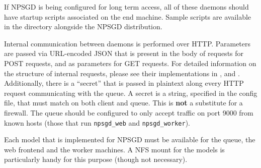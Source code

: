\documentclass{article}
\begin{document}
If NPSGD is being configured for long term access, all of these daemons should
have startup scripts associated on the end machine. Sample scripts are available
in the  directory alongside the NPSGD distribution.

Internal communication between daemons is performed over HTTP. Parameters are passed via URL-encoded
JSON that is present in the body of requests for POST requests, and as
parameters for GET requests. For detailed information on the structure of
internal requests, please see their implementations in ,
 and . Additionally, 
there is a ``secret'' that is passed in plaintext along every HTTP request communicating with the queue.
A secret is a string, specified in the config file, that must match on both client and queue. This
is \textbf{not} a substitute for a firewall. The queue should be configured to only accept traffic
on port 9000 from known hosts (those that run \texttt{npsgd\_web} and \texttt{npsgd\_worker}).


Each model that is implemented for NPSGD must be available for the queue, the
web frontend and the worker machines. A NFS mount for the models is particularly
handy for this purpose (though not necessary).
\end{document}
